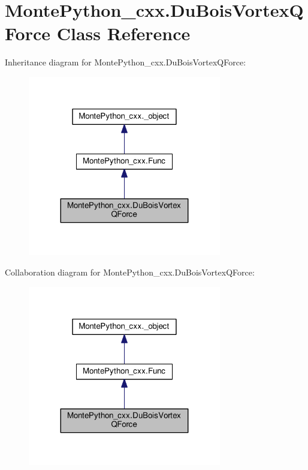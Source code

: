 \hypertarget{classMontePython__cxx_1_1DuBoisVortexQForce}{}\section{Monte\+Python\+\_\+cxx.\+Du\+Bois\+Vortex\+Q\+Force Class Reference}
\label{classMontePython__cxx_1_1DuBoisVortexQForce}


Inheritance diagram for Monte\+Python\+\_\+cxx.\+Du\+Bois\+Vortex\+Q\+Force\+:
\nopagebreak
\begin{figure}[H]
\begin{center}
\leavevmode
\includegraphics[width=239pt]{classMontePython__cxx_1_1DuBoisVortexQForce__inherit__graph}
\end{center}
\end{figure}


Collaboration diagram for Monte\+Python\+\_\+cxx.\+Du\+Bois\+Vortex\+Q\+Force\+:
\nopagebreak
\begin{figure}[H]
\begin{center}
\leavevmode
\includegraphics[width=239pt]{classMontePython__cxx_1_1DuBoisVortexQForce__coll__graph}
\end{center}
\end{figure}
